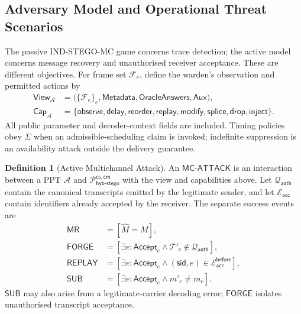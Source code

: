 \documentclass[pdflatex,sn-mathphys-num]{sn-jnl}%
\theoremstyle{definition}
\newtheorem{definition}{Definition}[section]
\theoremstyle{game}
\theoremstyle{thmstyleone}%
\theoremstyle{thmstyletwo}%
\theoremstyle{thmstylethree}%
\begin{document}
\subsection{Adversary Model and Operational Threat Scenarios}
\label{sec:adversary-operational}
The passive \textsf{IND-STEGO-MC} game concerns trace detection; the active
model concerns message recovery and unauthorised receiver acceptance.
These are different objectives. For frame set $\mathcal F_e$, define the
warden's observation and permitted actions by
\[
\begin{aligned}
\mathsf{View}_{\mathcal A}
 &=\bigl(\{\mathcal F_e\}_e,\mathsf{Metadata},\mathsf{OracleAnswers},\mathsf{Aux}\bigr),\\
\mathsf{Cap}_{\mathcal A}
 &=\{\mathsf{observe},\mathsf{delay},\mathsf{reorder},\mathsf{replay},
 \mathsf{modify},\mathsf{splice},\mathsf{drop},\mathsf{inject}\}.
\end{aligned}
\]
All public parameter and decoder-context fields are included. Timing
policies obey $\Sigma$ when an admissible-scheduling claim is invoked;
indefinite suppression is an availability attack outside the delivery guarantee.

\begin{definition}[Active Multichannel Attack]\label{definition7}
An $\mathsf{MC\text{-}ATTACK}$ is an interaction between a PPT $\mathcal A$
and $\mathcal P^{\mathsf{cs,cm}}_{\mathsf{hyb\text{-}stego}}$ with the view
and capabilities above. Let $\mathcal Q_{\mathsf{auth}}$ contain the canonical
transcripts emitted by the legitimate sender, and let
$\mathcal E_{\mathsf{acc}}$ contain identifiers already accepted by the receiver.
The separate success events are
\[
\begin{aligned}
\mathsf{MR}&=[\widehat M=M],\\
\mathsf{FORGE}&=[\exists e:\mathsf{Accept}_e\wedge\mathcal T'_e\notin\mathcal Q_{\mathsf{auth}}],\\
\mathsf{REPLAY}&=[\exists e:\mathsf{Accept}_e\wedge
 (\mathsf{sid},e)\in\mathcal E_{\mathsf{acc}}^{\mathsf{before}}],\\
\mathsf{SUB}&=[\exists e:\mathsf{Accept}_e\wedge m'_e\ne m_e].
\end{aligned}
\]
$\mathsf{SUB}$ may also arise from a legitimate-carrier decoding error;
$\mathsf{FORGE}$ isolates unauthorised transcript acceptance.
\end{definition}
\end{document}
